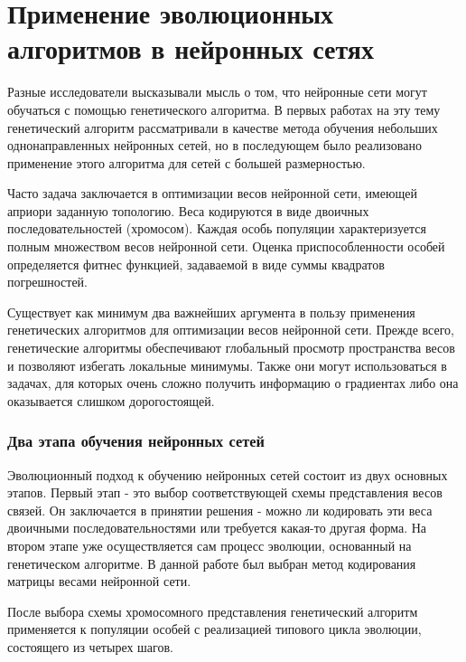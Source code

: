 \section{Применение эволюционных алгоритмов в нейронных сетях}

\indent \indent Разные исследователи высказывали мысль о том, что нейронные сети могут обучаться с помощью генетического алгоритма.
В первых работах на эту тему генетический алгоритм рассматривали в качестве метода обучения небольших однонаправленных нейронных сетей, но в последующем было реализовано применение этого алгоритма для сетей с большей размерностью.

Часто задача заключается в оптимизации весов нейронной сети, имеющей априори заданную топологию. Веса кодируются в виде двоичных последовательностей (хромосом). Каждая особь популяции характеризуется полным множеством весов нейронной сети. Оценка приспособленности особей определяется фитнес функцией, задаваемой в виде суммы квадратов погрешностей.

Существует как минимум два важнейших аргумента в пользу применения генетических алгоритмов для оптимизации весов нейронной сети. Прежде всего, генетические алгоритмы обеспечивают глобальный просмотр пространства весов и позволяют избегать локальные минимумы. Также они могут использоваться в задачах, для которых  очень сложно получить информацию о градиентах либо она оказывается слишком дорогостоящей.

\subsubsection*{Два этапа обучения нейронных сетей}

\indent \indent Эволюционный подход к обучению нейронных сетей состоит из двух основных этапов. Первый этап - это выбор соответствующей схемы представления весов связей. Он заключается в принятии решения - можно ли кодировать эти веса двоичными последовательностями или требуется какая-то другая форма. На втором этапе уже осуществляется сам процесс эволюции, основанный на генетическом алгоритме. В данной работе был выбран метод кодирования матрицы весами нейронной сети.

После выбора схемы хромосомного представления генетический алгоритм применяется к популяции особей с реализацией типового цикла эволюции, состоящего из четырех шагов.

